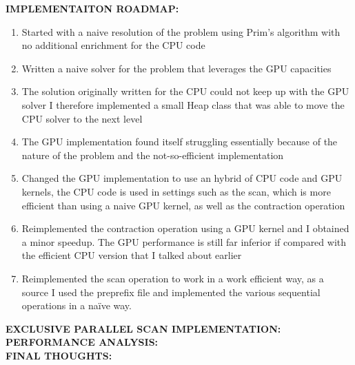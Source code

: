 \documentclass[a4paper,10pt]{article}
\begin{document}
\bigskip
{}
\makeatletter{}\makeatother
\label{sec:implementation-roadmap}
\noindent
\textbf{IMPLEMENTAITON ROADMAP:}
\\
\begin{enumerate}
	\item Started with a naive resolution of the problem using Prim's algorithm with no additional enrichment for the CPU code
	\item Written a naive solver for the problem that leverages the GPU capacities
	\item The solution originally written for the CPU could not keep up with the GPU solver I therefore implemented a small Heap class that was able to move the CPU solver to the next level
	\item The GPU implementation found itself struggling essentially because of the nature of the problem and the not-so-efficient implementation
	\item Changed the GPU implementation to use an hybrid of CPU code and GPU kernels, the CPU code is used in settings such as the scan, which is more efficient than using a naive GPU kernel, as well as the contraction operation
	\item Reimplemented the contraction operation using a GPU kernel and I obtained a minor speedup. The GPU performance is still far inferior if compared with the efficient CPU version that I talked about earlier
	\item Reimplemented the scan operation to work in a work efficient way, as a source I used the preprefix file and implemented the various sequential operations in a naïve way.
\end{enumerate}

\bigskip
{}
\makeatletter{}\makeatother
\label{sec:parallel-scan}
\noindent
\textbf{EXCLUSIVE PARALLEL SCAN IMPLEMENTATION:}
\\

\bigskip
{}
\makeatletter\def\@currentlabel{\texttt{(III)}}\makeatother
\label{sec:performance-analysis}
\noindent
\textbf{PERFORMANCE ANALYSIS:}
\\

\bigskip
{}
\makeatletter\def\@currentlabel{\texttt{(IV)}}\makeatother
\label{sec:final-thoughts}
\noindent
\textbf{FINAL THOUGHTS:}
\\

\clearpage

\printbibliography
\end{document}
